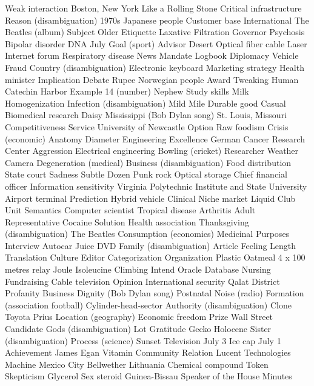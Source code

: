 Weak interaction  Boston, New York  Like a Rolling Stone  
Critical infrastructure  Reason (disambiguation)  1970s  
Japanese people  Customer base  International  
The Beatles (album)  Subject  Older  
Etiquette  Laxative  Filtration  
Governor  Psychosis  Bipolar disorder  
DNA  July  Goal (sport)  
Advisor  Desert  Optical fiber cable  
Laser  Internet forum  Respiratory disease  
News  Mandate  Logbook  
Diplomacy  Vehicle  Fraud  
Country (disambiguation)  Electronic keyboard  Marketing strategy  
Health minister  Implication  Debate  
Rupee  Norwegian people  Award  
Tweaking  Human  Catechin  
Harbor  Example  14 (number)  
Nephew  Study skills  Milk  
Homogenization  Infection (disambiguation)  Mild  
Mile  Durable good  Casual  
Biomedical research  Daisy  Mississippi (Bob Dylan song)  
St. Louis, Missouri  Competitiveness  Service  
University of Newcastle  Option  Raw foodism  
Crisis (economic)  Anatomy  Diameter  
Engineering  Excellence  German Cancer Research Center  
Aggression  Electrical engineering  Bowling (cricket)  
Researcher  Weather  Camera  
Degeneration (medical)  Business (disambiguation)  Food distribution  
State court  Sadness  Subtle  
Dozen  Punk rock  Optical storage  
Chief financial officer  Information sensitivity  Virginia Polytechnic Institute and State University  
Airport terminal  Prediction  Hybrid vehicle  
Clinical  Niche market  Liquid  
Club  Unit  Semantics  
Computer scientist  Tropical disease  Arthritis  
Adult  Representative  Cocaine  
Solution  Health association  Thanksgiving (disambiguation)  
The Beatles  Consumption (economics)  Medicinal Purposes  
Interview  Autocar  Juice  
DVD  Family (disambiguation)  Article  
Feeling  Length  Translation  
Culture  Editor  Categorization  
Organization  Plastic  Oatmeal  
4 x 100 metres relay  Joule  Isoleucine  
Climbing  Intend  Oracle Database  
Nursing  Fundraising  Cable television  
Opinion  International security  Qalat District  
Profanity  Business  Dignity (Bob Dylan song)  
Postnatal  Noise (radio)  Formation (association football)  
Cylinder-head-sector  Authority (disambiguation)  Clone  
Toyota Prius  Location (geography)  Economic freedom  
Prize  Wall Street  Candidate  
Gods (disambiguation)  Lot  Gratitude  
Gecko  Holocene  Sister (disambiguation)  
Process (science)  Sunset  Television  
July 3  Ice cap  July 1  
Achievement  James Egan  Vitamin  
Community  Relation  Lucent Technologies  
Machine  Mexico City  Bellwether  
Lithuania  Chemical compound  Token  
Skepticism  Glycerol  Sex steroid  
Guinea-Bissau  Speaker of the House  Minutes  
